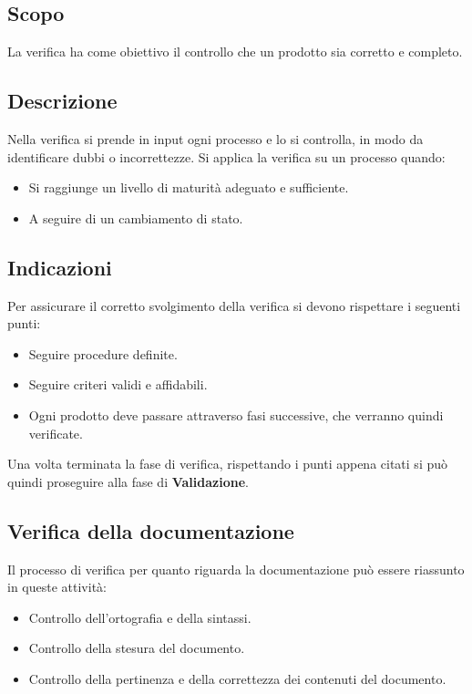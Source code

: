 \subsection{Scopo}
La verifica ha come obiettivo il controllo che un prodotto sia corretto e completo.

\subsection{Descrizione}
Nella verifica si prende in input ogni processo e lo si controlla, in modo da identificare dubbi o incorrettezze.
Si applica la verifica su un processo quando:
\begin{itemize}
  \item Si raggiunge un livello di maturità adeguato e sufficiente.
  \item A seguire di un cambiamento di stato.
\end{itemize}

\subsection{Indicazioni}
Per assicurare il corretto svolgimento della verifica si devono rispettare i seguenti punti:
\begin{itemize}
  \item Seguire procedure definite.
  \item Seguire criteri validi e affidabili.
  \item Ogni prodotto deve passare attraverso fasi successive, che verranno quindi verificate.
\end{itemize}
Una volta terminata la fase di verifica, rispettando i punti appena citati si può quindi proseguire alla fase di \textbf{Validazione}.

\subsection{Verifica della documentazione}
Il processo di verifica per quanto riguarda la documentazione può essere riassunto in queste attività:
\begin{itemize}
  \item Controllo dell'ortografia e della sintassi.
  \item Controllo della stesura del documento.
  \item Controllo della pertinenza e della correttezza dei contenuti del documento.
\end{itemize}

